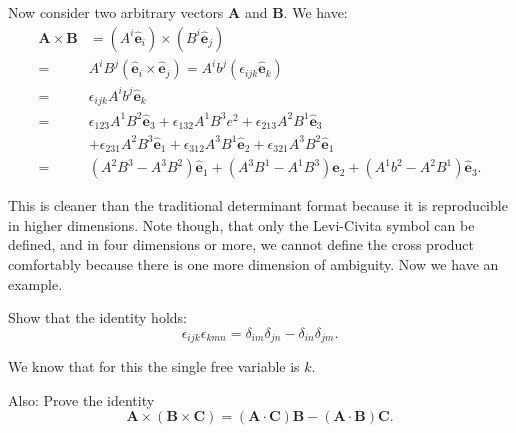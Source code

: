\documentclass[../main.tex]{subfiles}
\begin{document}
	Now consider two arbitrary vectors $\mathbf{A}$ and $\mathbf{B}$. We have:
	\begin{equation}
	  \begin{aligned}
	  \mathbf{A} \times \mathbf{B} &= (A^{i}\hat{\mathbf{e}}_{i}) \times (B^{i}\hat{\mathbf{e}}_{j}) \\
	  =& A^{i}B^{j}(\hat{\mathbf{e}}_{i} \times \hat{\mathbf{e}}_{j}) = A^{i}b^{j}(\epsilon_{ijk}\hat{\mathbf{e}}_{k}) \\
	  =& \epsilon_{ijk} A^{i}b^{j}\hat{\mathbf{e}}_{k} \\
	  =& \epsilon_{123}A^{1}B^{2}\hat{\mathbf{e}}_3 + \epsilon_{132}A^{1}B^{3}e^{2} + \epsilon_{213}A^{2}B^{1}\hat{\mathbf{e}}_3 \\
	  &+ \epsilon_{231}A^{2}B^{3}\hat{\mathbf{e}}_1 + \epsilon_{312}A^{3}B^{1}\hat{\mathbf{e}}_2 + \epsilon_{321}A^{3}B^{2}\hat{\mathbf{e}}_1 \\
	  =& (A^{2}B^{3}-A^{3}B^{2})\hat{\mathbf{e}}_1 + (A^{3}B^{1}-A^{1}B^{3})\hat{\mathbf{e}}_2 + (A^{1}b^{2}-A^{2}B^{1})\hat{\mathbf{e}}_3.
	  \end{aligned}
	\end{equation}

	This is cleaner than the traditional determinant format because it is reproducible in higher dimensions. Note though, that only the Levi-Civita symbol can be defined, and in four dimensions or more, we cannot define the cross product comfortably because there is one more dimension of ambiguity. Now we have an example.
	\begin{example}
		Show that the identity holds:
		\begin{equation}
		  \epsilon_{ijk}\epsilon_{kmn} = \delta_{im}\delta_{jn} - \delta_{in}\delta_{jm}.
		\end{equation}

		We know that for this the single free variable is $k$.
	\end{example}

	Also: Prove the identity 
	\begin{equation}
	  \mathbf{A} \times (\mathbf{B} \times \mathbf{C}) = (\mathbf{A} \cdot \mathbf{C})\mathbf{B} - (\mathbf{A} \cdot \mathbf{B})\mathbf{C}.
	\end{equation}
\end{document}

